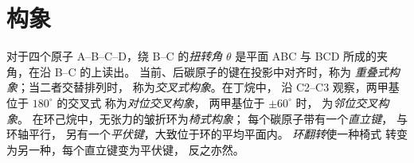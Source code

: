 \section{构象}

\begin{definition}[扭转角与构象]\label{def:b1:stereochemistry-in-depth:conformations}
对于四个原子 A--B--C--D，绕 B--C 的\emph{扭转角}
$\theta$ 是平面 ABC 与 BCD 所成的夹角，在沿 B--C 的上读出。
当前、后碳原子的键在投影中对齐时，称为
\emph{重叠式构象}；当二者交替排列时，
称为\emph{交叉式构象}。在丁烷中，
沿 C2--C3 观察，两甲基位于 $180^\circ$ 的交叉式
称为\emph{对位交叉构象}，
两甲基位于 $\pm 60^\circ$ 时，
为\emph{邻位交叉构象}。
在环己烷中，无张力的皱折环为\emph{椅式构象}；
每个碳原子带有一个\emph{直立键}，
与环轴平行，
另有一个\emph{平伏键}，大致位于环的平均平面内。
\emph{环翻转}使一种椅式
转变为另一种，每个直立键变为平伏键，
反之亦然。
\end{definition}

